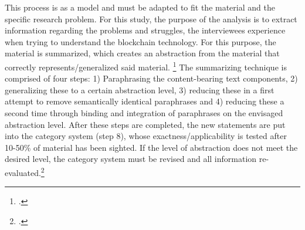 This process is as a model and must be adapted to fit the material and the specific research problem. For this study, the purpose of the analysis is to extract information regarding the problems and struggles, the interviewees experience when trying to understand the blockchain technology. For this purpose, the material is summarized, which creates an abstraction from the material that correctly represents/generalized said material. \footcite[Cf.][p.68]{MayringQualitativeContentAnalysis2014} The summarizing technique is comprised of four steps: 1) Paraphrasing the content-bearing text components, 2) generalizing these to a certain abstraction level, 3) reducing these in a first attempt to remove semantically identical paraphrases and 4) reducing these a second time through binding and integration of paraphrases on the envisaged abstraction level. After these steps are completed, the new statements are put into the category system (step 8), whose exactness/applicability is tested after 10-50\% of material has been sighted. If the level of abstraction does not meet the desired level, the category system must be revised and all information re-evaluated.\footcite[Cf.][p.68 et seq]{MayringQualitativeContentAnalysis2014}



